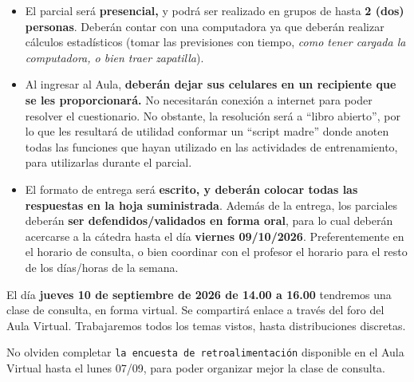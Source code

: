 \documentclass[
  spanish,
  letterpaper,
  DIV=11,
  numbers=noendperiod]{scrreprt}
\begin{document}
\begin{tcolorbox}[enhanced jigsaw, arc=.35mm, bottomrule=.15mm, bottomtitle=1mm, breakable, colback=white, colbacktitle=quarto-callout-important-color!10!white, colframe=quarto-callout-important-color-frame, coltitle=black, left=2mm, leftrule=.75mm, opacityback=0, opacitybacktitle=0.6, rightrule=.15mm, title=\textcolor{quarto-callout-important-color}{\faExclamation}\hspace{0.5em}{Pautas}, titlerule=0mm, toprule=.15mm, toptitle=1mm]

\begin{itemize}
\item
  El parcial será \textbf{presencial,} y podrá ser realizado en grupos
  de hasta \textbf{2 (dos) personas}. Deberán contar con una computadora
  ya que deberán realizar cálculos estadísticos (tomar las previsiones
  con tiempo, \emph{como tener cargada la computadora, o bien traer
  zapatilla}).
\item
  Al ingresar al Aula, \textbf{deberán dejar sus celulares en un
  recipiente que se les proporcionará.} No necesitarán conexión a
  internet para poder resolver el cuestionario. No obstante, la
  resolución será a ``libro abierto'', por lo que les resultará de
  utilidad conformar un ``script madre'' donde anoten todas las
  funciones que hayan utilizado en las actividades de entrenamiento,
  para utilizarlas durante el parcial.
\item
  El formato de entrega será \textbf{escrito, y deberán colocar todas
  las respuestas en la hoja suministrada}. Además de la entrega, los
  parciales deberán \textbf{ser defendidos/validados en forma oral},
  para lo cual deberán acercarse a la cátedra hasta el día
  \textbf{viernes 09/10/2026}. Preferentemente en el horario de
  consulta, o bien coordinar con el profesor el horario para el resto de
  los días/horas de la semana.
\end{itemize}

\end{tcolorbox}

\begin{tcolorbox}[enhanced jigsaw, arc=.35mm, bottomrule=.15mm, bottomtitle=1mm, breakable, colback=white, colbacktitle=quarto-callout-tip-color!10!white, colframe=quarto-callout-tip-color-frame, coltitle=black, left=2mm, leftrule=.75mm, opacityback=0, opacitybacktitle=0.6, rightrule=.15mm, title=\textcolor{quarto-callout-tip-color}{\faLightbulb}\hspace{0.5em}{Clase de Consulta}, titlerule=0mm, toprule=.15mm, toptitle=1mm]

El día \textbf{jueves 10 de septiembre de 2026 de 14.00 a 16.00}
tendremos una clase de consulta, en forma virtual. Se compartirá enlace
a través del foro del Aula Virtual. Trabajaremos todos los temas vistos,
hasta distribuciones discretas.

No olviden completar \texttt{la\ encuesta\ de\ retroalimentación}
disponible en el Aula Virtual hasta el lunes 07/09, para poder organizar
mejor la clase de consulta.

\end{tcolorbox}
\end{document}
